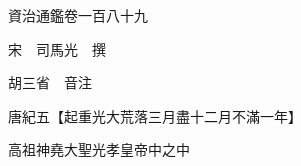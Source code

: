 










 


 
 


 

  
  
  
  
  





  
  
  
  
  
 
  

  

  
  
  



  

 
 

  
   




  

  
  


  　　資治通鑑卷一百八十九

　　宋　司馬光　撰

　　胡三省　音注

　　唐紀五【起重光大荒落三月盡十二月不滿一年】

　　高祖神堯大聖光孝皇帝中之中

